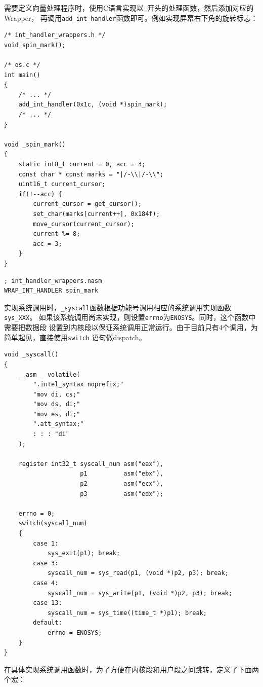 \documentclass[adobefonts, a4paper]{ctexart}
\begin{document}
需要定义向量处理程序时，使用C语言实现以\verb|_|开头的处理函数，然后添加对应的Wrapper，
再调用\verb|add_int_handler|函数即可。例如实现屏幕右下角的旋转标志：

\begin{verbatim}
/* int_handler_wrappers.h */
void spin_mark();

/* os.c */
int main()
{
    /* ... */
    add_int_handler(0x1c, (void *)spin_mark);
    /* ... */
}

void _spin_mark()
{
    static int8_t current = 0, acc = 3;
    const char * const marks = "|/-\\|/-\\";
    uint16_t current_cursor;
    if(!--acc) {
        current_cursor = get_cursor();
        set_char(marks[current++], 0x184f);
        move_cursor(current_cursor);
        current %= 8;
        acc = 3;
    }
}
\end{verbatim}

\begin{verbatim}
; int_handler_wrappers.nasm
WRAP_INT_HANDLER spin_mark
\end{verbatim}

实现系统调用时，\verb|_syscall|函数根据功能号调用相应的系统调用实现函数\verb|sys_XXX|。
如果该系统调用尚未实现，则设置\verb|errno|为\verb|ENOSYS|。同时，这个函数中需要把数据段
设置到内核段以保证系统调用正常运行。由于目前只有4个调用，为简单起见，直接使用\verb|switch|
语句做dispatch。

\begin{verbatim}
void _syscall()
{
    __asm__ volatile(
        ".intel_syntax noprefix;"
        "mov di, cs;"
        "mov ds, di;"
        "mov es, di;"
        ".att_syntax;"
        : : : "di"
    );

    register int32_t syscall_num asm("eax"),
                     p1          asm("ebx"),
                     p2          asm("ecx"),
                     p3          asm("edx");

    errno = 0;
    switch(syscall_num)
    {
        case 1:
            sys_exit(p1); break;
        case 3:
            syscall_num = sys_read(p1, (void *)p2, p3); break;
        case 4:
            syscall_num = sys_write(p1, (void *)p2, p3); break;
        case 13:
            syscall_num = sys_time((time_t *)p1); break;
        default:
            errno = ENOSYS;
    }
}
\end{verbatim}

在具体实现系统调用函数时，为了方便在内核段和用户段之间跳转，定义了下面两个宏：
\end{document}
